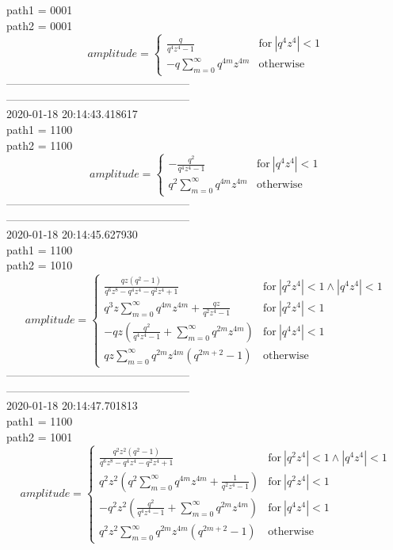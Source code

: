 path1 = 0001\\
path2 = 0001\\
$$amplitude = \begin{cases} \frac{q}{q^{4} z^{4} - 1} & \text{for}\: \left|{q^{4} z^{4}}\right| < 1 \\- q \sum_{m=0}^{\infty} q^{4 m} z^{4 m} & \text{otherwise} \end{cases}$$
--------------------------------------------------\\
--------------------------------------------------\\
2020-01-18 20:14:43.418617\\
path1 = 1100\\
path2 = 1100\\
$$amplitude = \begin{cases} - \frac{q^{2}}{q^{4} z^{4} - 1} & \text{for}\: \left|{q^{4} z^{4}}\right| < 1 \\q^{2} \sum_{m=0}^{\infty} q^{4 m} z^{4 m} & \text{otherwise} \end{cases}$$
--------------------------------------------------\\
--------------------------------------------------\\
2020-01-18 20:14:45.627930\\
path1 = 1100\\
path2 = 1010\\
$$amplitude = \begin{cases} \frac{q z \left(q^{2} - 1\right)}{q^{6} z^{8} - q^{4} z^{4} - q^{2} z^{4} + 1} & \text{for}\: \left|{q^{2} z^{4}}\right| < 1 \wedge \left|{q^{4} z^{4}}\right| < 1 \\q^{3} z \sum_{m=0}^{\infty} q^{4 m} z^{4 m} + \frac{q z}{q^{2} z^{4} - 1} & \text{for}\: \left|{q^{2} z^{4}}\right| < 1 \\- q z \left(\frac{q^{2}}{q^{4} z^{4} - 1} + \sum_{m=0}^{\infty} q^{2 m} z^{4 m}\right) & \text{for}\: \left|{q^{4} z^{4}}\right| < 1 \\q z \sum_{m=0}^{\infty} q^{2 m} z^{4 m} \left(q^{2 m + 2} - 1\right) & \text{otherwise} \end{cases}$$
--------------------------------------------------\\
--------------------------------------------------\\
2020-01-18 20:14:47.701813\\
path1 = 1100\\
path2 = 1001\\
$$amplitude = \begin{cases} \frac{q^{2} z^{2} \left(q^{2} - 1\right)}{q^{6} z^{8} - q^{4} z^{4} - q^{2} z^{4} + 1} & \text{for}\: \left|{q^{2} z^{4}}\right| < 1 \wedge \left|{q^{4} z^{4}}\right| < 1 \\q^{2} z^{2} \left(q^{2} \sum_{m=0}^{\infty} q^{4 m} z^{4 m} + \frac{1}{q^{2} z^{4} - 1}\right) & \text{for}\: \left|{q^{2} z^{4}}\right| < 1 \\- q^{2} z^{2} \left(\frac{q^{2}}{q^{4} z^{4} - 1} + \sum_{m=0}^{\infty} q^{2 m} z^{4 m}\right) & \text{for}\: \left|{q^{4} z^{4}}\right| < 1 \\q^{2} z^{2} \sum_{m=0}^{\infty} q^{2 m} z^{4 m} \left(q^{2 m + 2} - 1\right) & \text{otherwise} \end{cases}$$

